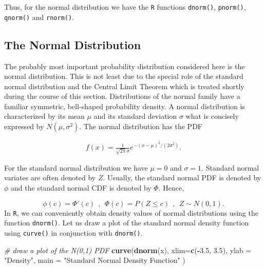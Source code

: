 \documentclass[]{book}
\newenvironment{Shaded}{\begin{snugshade}}{\end{snugshade}}
\newcommand{\KeywordTok}[1]{\textcolor[rgb]{0.13,0.29,0.53}{\textbf{#1}}}
\newcommand{\DataTypeTok}[1]{\textcolor[rgb]{0.13,0.29,0.53}{#1}}
\newcommand{\FloatTok}[1]{\textcolor[rgb]{0.00,0.00,0.81}{#1}}
\newcommand{\StringTok}[1]{\textcolor[rgb]{0.31,0.60,0.02}{#1}}
\newcommand{\CommentTok}[1]{\textcolor[rgb]{0.56,0.35,0.01}{\textit{#1}}}
\newcommand{\OperatorTok}[1]{\textcolor[rgb]{0.81,0.36,0.00}{\textbf{#1}}}
\newcommand{\NormalTok}[1]{#1}
\theoremstyle{definition}
\theoremstyle{definition}
\theoremstyle{definition}
\theoremstyle{remark}
\begin{document}
Thus, for the normal distribution we have the \texttt{R} functions
\texttt{dnorm()}, \texttt{pnorm()}, \texttt{qnorm()} and
\texttt{rnorm()}.

\subsection*{The Normal Distribution}\label{the-normal-distribution}

The probably most important probability distribution considered here is
the normal distribution. This is not least due to the special role of
the standard normal distribution and the Central Limit Theorem which is
treated shortly during the course of this section. Distributions of the
normal family have a familiar symmetric, bell-shaped probability
density. A normal distribution is characterized by its mean \(\mu\) and
its standard deviation \(\sigma\) what is concisely expressed by
\(N(\mu,\sigma^2)\). The normal distribution has the PDF

\begin{align}
f(x) = \frac{1}{\sqrt{2 \pi} \sigma} e^{-(x - μ)^2/(2 σ^2)}.
\end{align}

For the standard normal distribution we have \(\mu=0\) and \(\sigma=1\).
Standard normal variates are often denoted by \(Z\). Usually, the
standard normal PDF is denoted by \(\phi\) and the standard normal CDF
is denoted by \(\Phi\). Hence,

\[ \phi(c) = \Phi'(c) \ \ , \ \ \Phi(c) = P(Z \leq c) \ \ , \ \ Z \sim N(0,1).
\] In \texttt{R}, we can conveniently obtain density values of normal
distributions using the function \texttt{dnorm()}. Let us draw a plot of
the standard normal density function using \texttt{curve()} in
conjunction with \texttt{dnorm()}.

\begin{Shaded}
\begin{Highlighting}[]
\CommentTok{# draw a plot of the N(0,1) PDF}
\KeywordTok{curve}\NormalTok{(}\KeywordTok{dnorm}\NormalTok{(x),}
      \DataTypeTok{xlim=}\KeywordTok{c}\NormalTok{(}\OperatorTok{-}\FloatTok{3.5}\NormalTok{, }\FloatTok{3.5}\NormalTok{),}
      \DataTypeTok{ylab =} \StringTok{"Density"}\NormalTok{, }
      \DataTypeTok{main =} \StringTok{"Standard Normal Density Function"}
\NormalTok{      ) }
\end{Highlighting}
\end{Shaded}
\end{document}
